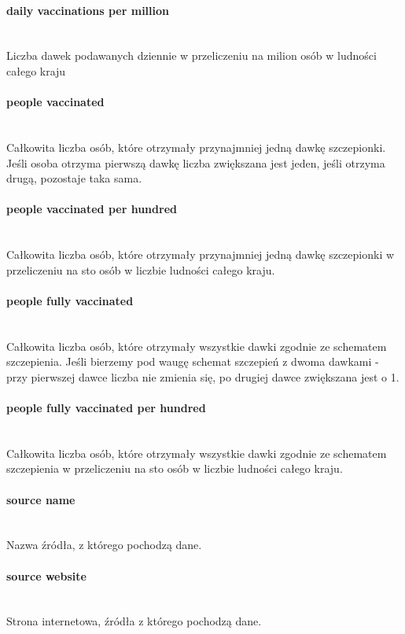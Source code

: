 \documentclass[12pt, oneside, openany]{article}
\begin{document}
\paragraph{daily vaccinations per million}
\mbox{}\\
Liczba dawek podawanych dziennie w przeliczeniu na milion osób w ludności całego kraju

\paragraph{people vaccinated}
\mbox{}\\
Całkowita liczba osób, które otrzymały przynajmniej jedną dawkę szczepionki. Jeśli osoba otrzyma pierwszą dawkę liczba zwiększana jest jeden, jeśli otrzyma drugą, pozostaje taka sama. 

\paragraph{people vaccinated per hundred}
\mbox{}\\
Całkowita liczba osób, które otrzymały przynajmniej jedną dawkę szczepionki w przeliczeniu na sto osób w liczbie ludności całego kraju.

\paragraph{people fully vaccinated}
\mbox{}\\
Całkowita liczba osób, które otrzymały wszystkie dawki zgodnie ze schematem szczepienia. Jeśli bierzemy pod waugę schemat szczepień z dwoma dawkami - przy pierwszej dawce liczba nie zmienia się, po drugiej dawce zwiększana jest o 1. 

\paragraph{people fully vaccinated per hundred}
\mbox{}\\
Całkowita liczba osób, które otrzymały wszystkie dawki zgodnie ze schematem szczepienia w przeliczeniu na sto osób w liczbie ludności całego kraju.

\paragraph{source name}
\mbox{}\\
Nazwa źródła, z którego pochodzą dane.

\paragraph{source website}
\mbox{}\\
Strona internetowa, źródła z którego pochodzą dane. 
\end{document}

